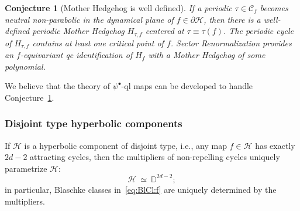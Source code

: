 \documentclass{amsart}
\newcommand{\1}{{\mathbb 1 }}
\newcommand\HH{\mathcal{H}}%
\newcommand{\Disk}{\mathbb{D}}
\newtheorem{conj}[thm]{Conjecture}
\theoremstyle{remark}
\numberwithin{equation}{section}
\theoremstyle{definition}
\begin{document}
\begin{conj}[Mother Hedgehog is well defined] \label{conj:MH}If a periodic $\tau\in \mathcal C_f$ becomes neutral non-parabolic in the dynamical plane of $f\in \partial \HH$, then there is a well-defined periodic Mother Hedgehog $H_{\tau,f}$ centered at $\tau\equiv \tau(f)$. The periodic cycle of $H_{\tau,f}$ contains at least one critical point of $f$. Sector Renormalization provides an $f$-equivariant qc identification of $H_f$ with a Mother Hedgehog of some polynomial.
\end{conj}

We believe that the theory of $\psi^\bullet$-ql maps can be developed to handle Conjecture~\ref{conj:MH}.







\subsubsection{Disjoint type hyperbolic components} \label{sss:disj:type}If $\mathcal{H}$ is a hyperbolic component of disjoint type, i.e., any map $f \in \mathcal{H}$ has exactly $2d-2$ attracting cycles, then the multipliers of non-repelling cycles uniquely parametrize $\mathcal H$:
\[ \mathcal H \ \simeq \ \Disk^{2d-2};\]
in particular, Blaschke classes in~\eqref{eq:BlCl:f} are uniquely determined by the multipliers.
\end{document}
